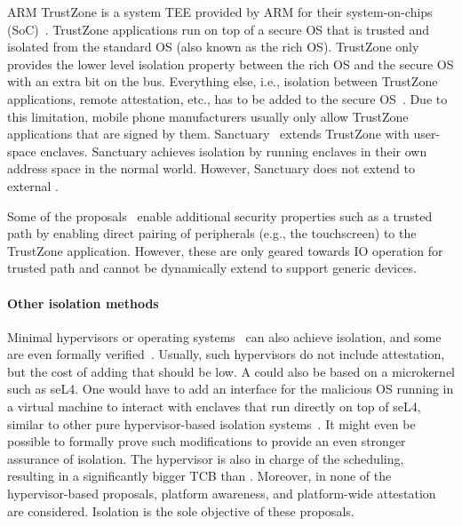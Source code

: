 ARM TrustZone is a system TEE provided by ARM for their system-on-chips (SoC)~\cite{winter2008trusted}. TrustZone applications run on top of a secure OS that is trusted and isolated from the standard OS (also known as the rich OS). 
TrustZone only provides the lower level isolation property between the rich OS and the secure OS with an extra bit on the bus. Everything else, i.e., isolation between TrustZone applications, remote attestation, etc., has to be added to the secure OS~\cite{ning2014samsungknox}. Due to this limitation, mobile phone manufacturers usually only allow TrustZone applications that are signed by them. 
Sanctuary~\cite{brasser2019sanctuary} extends TrustZone with user-space enclaves. Sanctuary achieves isolation by running enclaves in their own address space in the normal world. However, Sanctuary does not extend to external \sphw.

Some of the proposals~\cite{TruZ-Droid,trustUI,SeCloak,VButton} enable additional security properties such as a trusted path by enabling direct pairing of peripherals (e.g., the touchscreen) to the TrustZone application. However, these are only geared towards IO operation for trusted path and cannot be dynamically extend to support generic devices.

\paragraph{Other isolation methods} Minimal hypervisors or operating systems~\cite{herder2006minix,klein2009sel4} can also achieve isolation, and some are even formally verified~\cite{klein2009sel4}. Usually, such hypervisors do not include attestation, but the cost of adding that should be low. A \name{} could also be based on a microkernel such as seL4. One would have to add an interface for the malicious OS running in a virtual machine to interact with enclaves that run directly on top of seL4, similar to other pure hypervisor-based isolation systems~\cite{virtualGhost,Overshadow,InkTag,TrustVisor,SplittingInterfaces,terra}. It might even be possible to formally prove such modifications to provide an even stronger assurance of isolation. 
The hypervisor is also in charge of the scheduling, resulting in a significantly bigger TCB than \name. Moreover, in none of the hypervisor-based proposals, platform awareness, and platform-wide attestation are considered. Isolation is the sole objective of these proposals.

